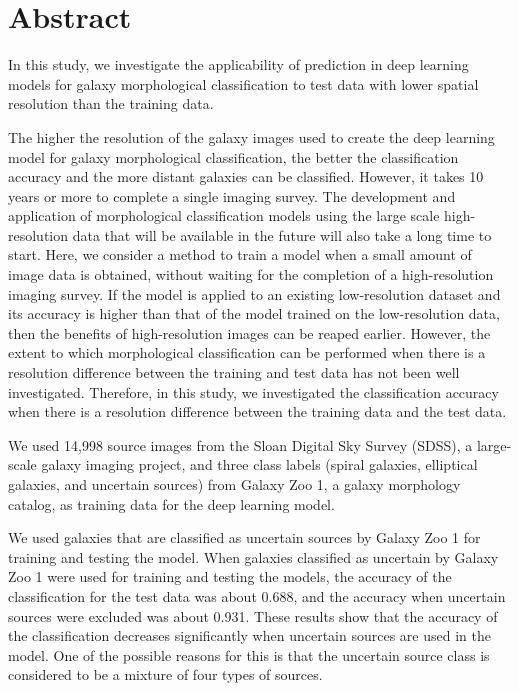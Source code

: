 \documentclass[a4j, 11pt]{jreport}
\begin{document}

\chapter*{Abstract}
In this study, we investigate the applicability of prediction in deep learning models for galaxy morphological classification to test data with lower spatial resolution than the training data.

The higher the resolution of the galaxy images used to create the deep learning model for galaxy morphological classification, the better the classification accuracy and the more distant galaxies can be classified. However, it takes 10 years or more to complete a single imaging survey. The development and application of morphological classification models using the large scale high-resolution data that will be available in the future will also take a long time to start. Here, we consider a method to train a model when a small amount of image data is obtained, without waiting for the completion of a high-resolution imaging survey. If the model is applied to an existing low-resolution dataset and its accuracy is higher than that of the model trained on the low-resolution data, then the benefits of high-resolution images can be reaped earlier. However, the extent to which morphological classification can be performed when there is a resolution difference between the training and test data has not been well investigated. Therefore, in this study, we investigated the classification accuracy when there is a resolution difference between the training data and the test data.

We used 14,998 source images from the Sloan Digital Sky Survey (SDSS), a large-scale galaxy imaging project, and three class labels (spiral galaxies, elliptical galaxies, and uncertain sources) from Galaxy Zoo 1, a galaxy morphology catalog, as training data for the deep learning model.

We used galaxies that are classified as uncertain sources by Galaxy Zoo 1 for training and testing the model. When galaxies classified as uncertain by Galaxy Zoo 1 were used for training and testing the models, the accuracy of the classification for the test data was about 0.688, and the accuracy when uncertain sources were excluded was about 0.931.
These results show that the accuracy of the classification decreases significantly when uncertain sources are used in the model. One of the possible reasons for this is that the uncertain source class is considered to be a mixture of four types of sources.
\end{document}
